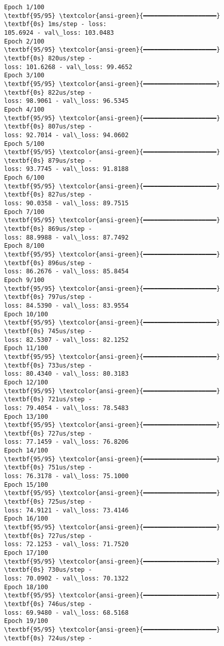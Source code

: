 \documentclass[11pt]{article}
\begin{document}
    \begin{Verbatim}[commandchars=\\\{\}]
Epoch 1/100
\textbf{95/95} \textcolor{ansi-green}{━━━━━━━━━━━━━━━━━━━━} \textbf{0s} 1ms/step - loss:
105.6924 - val\_loss: 103.0483
Epoch 2/100
\textbf{95/95} \textcolor{ansi-green}{━━━━━━━━━━━━━━━━━━━━} \textbf{0s} 820us/step -
loss: 101.6268 - val\_loss: 99.4652
Epoch 3/100
\textbf{95/95} \textcolor{ansi-green}{━━━━━━━━━━━━━━━━━━━━} \textbf{0s} 822us/step -
loss: 98.9061 - val\_loss: 96.5345
Epoch 4/100
\textbf{95/95} \textcolor{ansi-green}{━━━━━━━━━━━━━━━━━━━━} \textbf{0s} 807us/step -
loss: 92.7014 - val\_loss: 94.0602
Epoch 5/100
\textbf{95/95} \textcolor{ansi-green}{━━━━━━━━━━━━━━━━━━━━} \textbf{0s} 879us/step -
loss: 93.7745 - val\_loss: 91.8188
Epoch 6/100
\textbf{95/95} \textcolor{ansi-green}{━━━━━━━━━━━━━━━━━━━━} \textbf{0s} 827us/step -
loss: 90.0358 - val\_loss: 89.7515
Epoch 7/100
\textbf{95/95} \textcolor{ansi-green}{━━━━━━━━━━━━━━━━━━━━} \textbf{0s} 869us/step -
loss: 88.9988 - val\_loss: 87.7492
Epoch 8/100
\textbf{95/95} \textcolor{ansi-green}{━━━━━━━━━━━━━━━━━━━━} \textbf{0s} 896us/step -
loss: 86.2676 - val\_loss: 85.8454
Epoch 9/100
\textbf{95/95} \textcolor{ansi-green}{━━━━━━━━━━━━━━━━━━━━} \textbf{0s} 797us/step -
loss: 84.5390 - val\_loss: 83.9554
Epoch 10/100
\textbf{95/95} \textcolor{ansi-green}{━━━━━━━━━━━━━━━━━━━━} \textbf{0s} 745us/step -
loss: 82.5307 - val\_loss: 82.1252
Epoch 11/100
\textbf{95/95} \textcolor{ansi-green}{━━━━━━━━━━━━━━━━━━━━} \textbf{0s} 733us/step -
loss: 80.4340 - val\_loss: 80.3183
Epoch 12/100
\textbf{95/95} \textcolor{ansi-green}{━━━━━━━━━━━━━━━━━━━━} \textbf{0s} 721us/step -
loss: 79.4054 - val\_loss: 78.5483
Epoch 13/100
\textbf{95/95} \textcolor{ansi-green}{━━━━━━━━━━━━━━━━━━━━} \textbf{0s} 727us/step -
loss: 77.1459 - val\_loss: 76.8206
Epoch 14/100
\textbf{95/95} \textcolor{ansi-green}{━━━━━━━━━━━━━━━━━━━━} \textbf{0s} 751us/step -
loss: 76.3178 - val\_loss: 75.1000
Epoch 15/100
\textbf{95/95} \textcolor{ansi-green}{━━━━━━━━━━━━━━━━━━━━} \textbf{0s} 725us/step -
loss: 74.9121 - val\_loss: 73.4146
Epoch 16/100
\textbf{95/95} \textcolor{ansi-green}{━━━━━━━━━━━━━━━━━━━━} \textbf{0s} 727us/step -
loss: 72.1253 - val\_loss: 71.7520
Epoch 17/100
\textbf{95/95} \textcolor{ansi-green}{━━━━━━━━━━━━━━━━━━━━} \textbf{0s} 730us/step -
loss: 70.0902 - val\_loss: 70.1322
Epoch 18/100
\textbf{95/95} \textcolor{ansi-green}{━━━━━━━━━━━━━━━━━━━━} \textbf{0s} 746us/step -
loss: 69.9480 - val\_loss: 68.5168
Epoch 19/100
\textbf{95/95} \textcolor{ansi-green}{━━━━━━━━━━━━━━━━━━━━} \textbf{0s} 724us/step -

\end{Verbatim}
\end{document}
